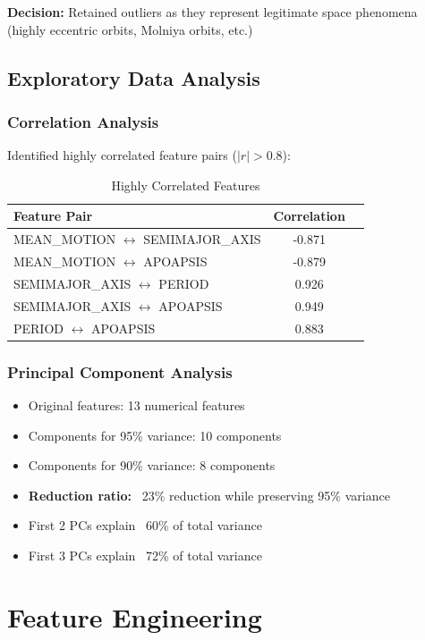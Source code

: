 \documentclass[12pt,a4paper]{article}
\begin{document}
\textbf{Decision:} Retained outliers as they represent legitimate space phenomena (highly eccentric orbits, Molniya orbits, etc.)

\subsection{Exploratory Data Analysis}

\subsubsection{Correlation Analysis}
Identified highly correlated feature pairs ($|r| > 0.8$):
\begin{table}[H]
\centering
\begin{tabular}{@{}lcc@{}}
\toprule
\textbf{Feature Pair} & \textbf{Correlation} \\
\midrule
MEAN\_MOTION $\leftrightarrow$ SEMIMAJOR\_AXIS & -0.871 \\
MEAN\_MOTION $\leftrightarrow$ APOAPSIS & -0.879 \\
SEMIMAJOR\_AXIS $\leftrightarrow$ PERIOD & 0.926 \\
SEMIMAJOR\_AXIS $\leftrightarrow$ APOAPSIS & 0.949 \\
PERIOD $\leftrightarrow$ APOAPSIS & 0.883 \\
\bottomrule
\end{tabular}
\caption{Highly Correlated Features}
\label{tab:correlation}
\end{table}

\subsubsection{Principal Component Analysis}
\begin{itemize}
    \item Original features: 13 numerical features
    \item Components for 95\% variance: 10 components
    \item Components for 90\% variance: 8 components
    \item \textbf{Reduction ratio:} ~23\% reduction while preserving 95\% variance
    \item First 2 PCs explain ~60\% of total variance
    \item First 3 PCs explain ~72\% of total variance
\end{itemize}

\section{Feature Engineering}
\end{document}
